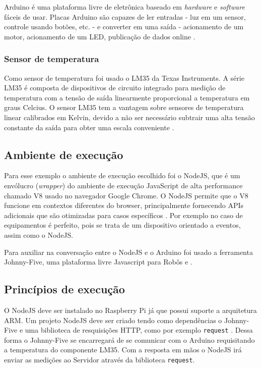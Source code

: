 Arduino é uma plataforma livre de eletrônica baseado em \emph{hardware}
e \emph{software} fáceis de usar. Placas Arduino são capazes de ler
entradas - luz em um sensor, controle usando botões, etc. - e converter
em uma saída - acionamento de um motor, acionamento de um LED,
publicação de dados online \cite{arduino:2016}.

\subsubsection{Sensor de temperatura}\label{sensor-de-temperatura}

Como sensor de temperatura foi usado o LM35 da Texas Instruments. A
série LM35 é composta de dispositivos de circuito integrado para medição
de temperatura com a tensão de saída linearmente proporcional a
temperatura em graus Celcius. O sensor LM35 tem a vantagem sobre
sensores de temperatura linear calibrados em Kelvin, devido a não ser
necessário subtrair uma alta tensão constante da saída para obter uma
escala conveniente \cite{lm35:2016}.

\subsection{Ambiente de execução}\label{ambiente-de-execuuxe7uxe3o}

Para esse exemplo o ambiente de execução escolhido foi o NodeJS, que é
um envólucro (\emph{wrapper}) do ambiente de execução JavaScript de alta
performance chamado V8 usado no navegador Google Chrome. O NodeJS
permite que o V8 funcione em contextos diferentes do browser,
principalmente fornecendo APIs adicionais que são otimizadas para casos
específicos \cite{hughes-croucher:2012}. Por exemplo no caso de
equipamentos \iot é perfeito, pois se trata de um dispositivo orientado
a eventos, assim como o NodeJS.

Para auxiliar na conversação entre o NodeJS e o Arduino foi usado a
ferramenta Johnny-Five, uma plataforma livre Javascript para Robôs e
\iot \cite{johnny-five:2012}.

\subsection{Princípios de
execução}\label{princuxedpios-de-execuuxe7uxe3o}

O NodeJS deve ser instalado no Raspberry Pi já que possui suporte a
arquitetura ARM. Um projeto NodeJS deve ser criado tendo como
dependências o Johnny-Five e uma biblioteca de resquisições HTTP, como
por exemplo \texttt{request} \cite{request:2016}. Dessa forma o
Johnny-Five se encarregará de se comunicar com o Arduino requisitando a
temperatura do componente LM35. Com a resposta em mãos o NodeJS irá
enviar as medições ao Servidor através da biblioteca \texttt{request}.

